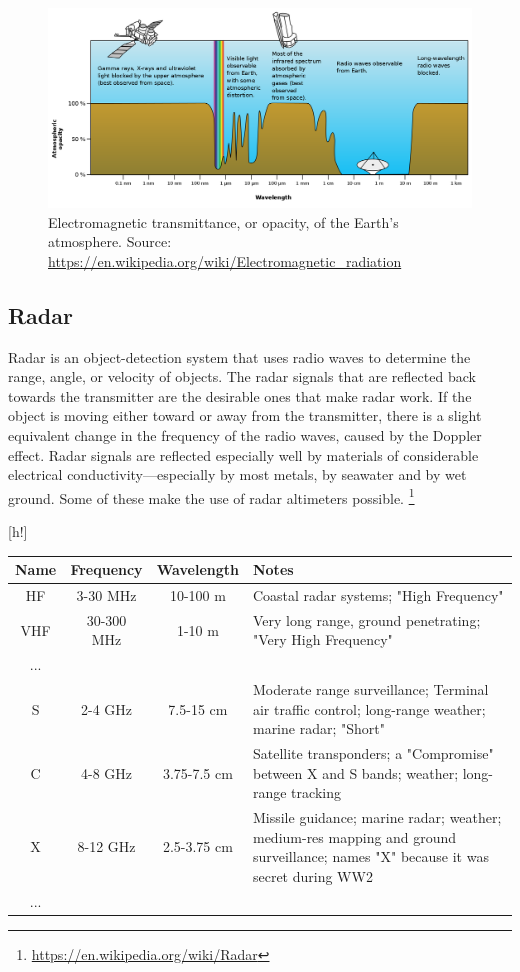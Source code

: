\documentclass{article}
\makeatletter
\renewenvironment{table}
     {\@float{table} \small}
     {\end@float}
\makeatother
\begin{document}
\begin{figure}[h!]    
\centering
\includegraphics[width=\linewidth]{figures/Atmospheric_electromagnetic_opacity.png}
\caption{Electromagnetic transmittance, or opacity, of the Earth's atmosphere. Source: \url{https://en.wikipedia.org/wiki/Electromagnetic_radiation}}
\label{fig:atm_opacity}
\end{figure}

\subsection{Radar}
Radar is an object-detection system that uses radio waves to determine the range, angle, or velocity of objects. The radar signals that are reflected back towards the transmitter are the desirable ones that make radar work. If the object is moving either toward or away from the transmitter, there is a slight equivalent change in the frequency of the radio waves, caused by the Doppler effect. 
Radar signals are reflected especially well by materials of considerable electrical conductivity—especially by most metals, by seawater and by wet ground. Some of these make the use of radar altimeters possible.
\footnote{\url{https://en.wikipedia.org/wiki/Radar}}

\begin{table}[h!]
\centering
\caption{Radar Frequency Bands. Source: \url{https://en.wikipedia.org/wiki/Radar}}
\label{tb:radar_bands}
\begin{tabularx}{\textwidth}{C{0.2}C{0.8}C{0.8}L{2.2}}
\toprule
Name & 
Frequency & 
Wavelength & 
Notes \\ 
\midrule
HF & 3-30 MHz & 10-100 m & Coastal radar systems; "High Frequency" \\
VHF & 30-300 MHz & 1-10 m & Very long range, ground penetrating; "Very High Frequency" \\
... &  & & \\
S & 2-4 GHz & 7.5-15 cm & Moderate range surveillance; Terminal air traffic control; long-range weather; marine radar; "Short" \\
C & 4-8 GHz & 3.75-7.5 cm & Satellite transponders; a "Compromise" between X and S bands; weather; long-range tracking \\
X & 8-12 GHz & 2.5-3.75 cm & Missile guidance; marine radar; weather; medium-res mapping and ground surveillance; names "X" because it was secret during WW2 \\
... &  & & \\
\bottomrule
\end{tabularx}
\end{table}
\end{document}
